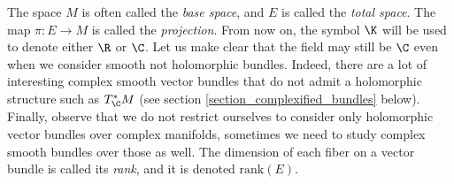 
The space \(M\) is often called the \textit{base space}, and \(E\) is called the \textit{total space}. The map \(\pi\colon E \to M\) is called the \textit{projection}. From now on, the symbol \(\K\) will be used to denote either \(\R\) or \(\C\). Let us make clear that the field may still be \(\C\) even when we consider smooth not holomorphic bundles. Indeed, there are a lot of interesting complex smooth vector bundles that do not admit a holomorphic structure such as \(T_\C^*M\) (see section \ref{section_complexified_bundles} below). Finally, observe that we do not restrict ourselves to consider only holomorphic vector bundles over complex manifolds, sometimes we need to study complex smooth bundles over those as well. The dimension of each fiber on a vector bundle is called its \textit{rank}, and it is denoted \(\mathrm{rank}(E)\). \\

